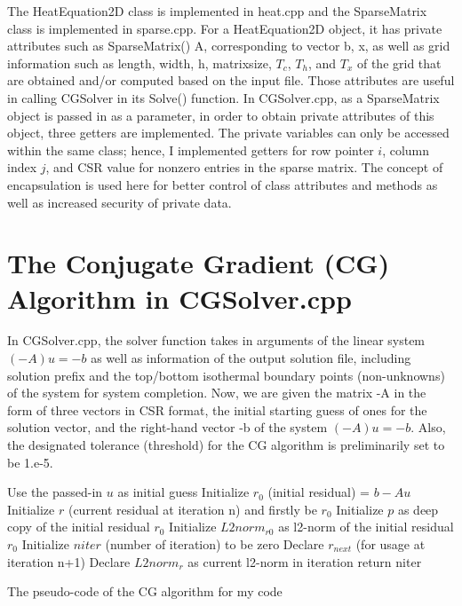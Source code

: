 \documentclass{article}
\begin{document}
The {\selectfont HeatEquation2D} class is implemented in {\selectfont heat.cpp} and the {\selectfont SparseMatrix} class is implemented in {\selectfont sparse.cpp}. For a {\selectfont HeatEquation2D} object, it has private attributes such as {\selectfont SparseMatrix() A}, corresponding to vector {\selectfont b, x}, as well as grid information such as {\selectfont length, width, h, matrixsize}, $T_{c}$, $T_{h}$, and $T_{x}$ of the grid that are obtained and/or computed based on the input file. Those attributes are useful in calling CGSolver in its Solve() function. In {\selectfont CGSolver.cpp}, as a {\selectfont SparseMatrix} object is passed in as a parameter, in order to obtain private attributes of this object, three getters are implemented. The private variables can only be accessed within the same class; hence, I implemented getters for row pointer $i$, column index $j$, and CSR value for nonzero entries in the sparse matrix. The concept of encapsulation is used here for better control of class attributes and methods as well as increased security of private data. 


\section{The Conjugate Gradient (CG) Algorithm in {\selectfont CGSolver.cpp}}
In {\selectfont CGSolver.cpp}, the solver function takes in arguments of the linear system $(-A)u = -b$ as well as information of the output solution file, including solution prefix and the top/bottom isothermal boundary points (non-unknowns) of the system for system completion.
Now, we are given the matrix -A in the form of three vectors in CSR format, the initial starting guess of ones for the solution vector, and the right-hand vector -b of the system $(-A)u = -b$. Also, the designated tolerance (threshold) for the CG algorithm is preliminarily set to be {\selectfont 1.e-5}.
\begin{algorithm}
\SetAlgoLined
 Use the passed-in $u$ as initial guess\;
 Initialize $r_{0}$ (initial residual) = $b - Au$\;
 Initialize $r$ (current residual at iteration n) and firstly be $r_{0}$\;
 Initialize $p$ as deep copy of the initial residual $r_{0}$\;
 Initialize $L2norm_{r0}$ as l2-norm of the initial residual $r_{0}$\;
 Initialize $niter$ (number of iteration) to be zero\;
 Declare $r_{next}$ (for usage at iteration n+1)\;
 Declare $L2norm_{r}$ as current l2-norm in iteration\; 
 return niter\;
 \caption{The pseudo-code of the CG algorithm for my code}
\end{algorithm}
\end{document}
